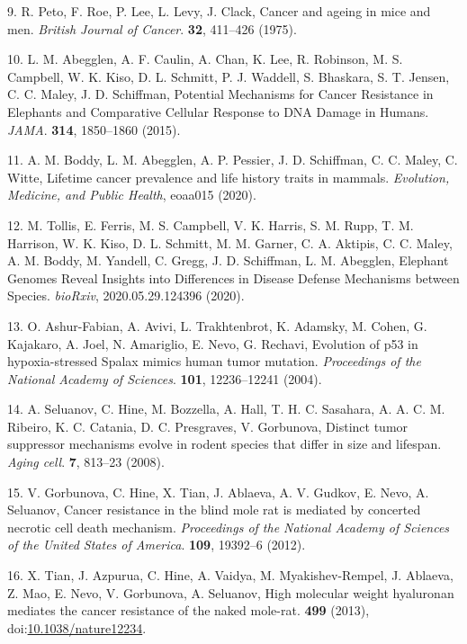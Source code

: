 \documentclass[]{elsarticle} %
\begin{document}
\leavevmode\hypertarget{ref-Peto1975}{}%
9. R. Peto, F. Roe, P. Lee, L. Levy, J. Clack, Cancer and ageing in mice and men. \emph{British Journal of Cancer}. \textbf{32}, 411--426 (1975).

\leavevmode\hypertarget{ref-Abegglen:JAMA2015}{}%
10. L. M. Abegglen, A. F. Caulin, A. Chan, K. Lee, R. Robinson, M. S. Campbell, W. K. Kiso, D. L. Schmitt, P. J. Waddell, S. Bhaskara, S. T. Jensen, C. C. Maley, J. D. Schiffman, Potential Mechanisms for Cancer Resistance in Elephants and Comparative Cellular Response to DNA Damage in Humans. \emph{JAMA}. \textbf{314}, 1850--1860 (2015).

\leavevmode\hypertarget{ref-Boddy2020}{}%
11. A. M. Boddy, L. M. Abegglen, A. P. Pessier, J. D. Schiffman, C. C. Maley, C. Witte, Lifetime cancer prevalence and life history traits in mammals. \emph{Evolution, Medicine, and Public Health}, eoaa015 (2020).

\leavevmode\hypertarget{ref-Tollis2020}{}%
12. M. Tollis, E. Ferris, M. S. Campbell, V. K. Harris, S. M. Rupp, T. M. Harrison, W. K. Kiso, D. L. Schmitt, M. M. Garner, C. A. Aktipis, C. C. Maley, A. M. Boddy, M. Yandell, C. Gregg, J. D. Schiffman, L. M. Abegglen, Elephant Genomes Reveal Insights into Differences in Disease Defense Mechanisms between Species. \emph{bioRxiv}, 2020.05.29.124396 (2020).

\leavevmode\hypertarget{ref-Ashur-Fabian2004}{}%
13. O. Ashur-Fabian, A. Avivi, L. Trakhtenbrot, K. Adamsky, M. Cohen, G. Kajakaro, A. Joel, N. Amariglio, E. Nevo, G. Rechavi, Evolution of p53 in hypoxia-stressed Spalax mimics human tumor mutation. \emph{Proceedings of the National Academy of Sciences}. \textbf{101}, 12236--12241 (2004).

\leavevmode\hypertarget{ref-Seluanov2008}{}%
14. A. Seluanov, C. Hine, M. Bozzella, A. Hall, T. H. C. Sasahara, A. A. C. M. Ribeiro, K. C. Catania, D. C. Presgraves, V. Gorbunova, Distinct tumor suppressor mechanisms evolve in rodent species that differ in size and lifespan. \emph{Aging cell}. \textbf{7}, 813--23 (2008).

\leavevmode\hypertarget{ref-Gorbunova2012}{}%
15. V. Gorbunova, C. Hine, X. Tian, J. Ablaeva, A. V. Gudkov, E. Nevo, A. Seluanov, Cancer resistance in the blind mole rat is mediated by concerted necrotic cell death mechanism. \emph{Proceedings of the National Academy of Sciences of the United States of America}. \textbf{109}, 19392--6 (2012).

\leavevmode\hypertarget{ref-Tian2013}{}%
16. X. Tian, J. Azpurua, C. Hine, A. Vaidya, M. Myakishev-Rempel, J. Ablaeva, Z. Mao, E. Nevo, V. Gorbunova, A. Seluanov, High molecular weight hyaluronan mediates the cancer resistance of the naked mole-rat. \textbf{499} (2013), doi:\href{https://doi.org/10.1038/nature12234}{10.1038/nature12234}.
\end{document}
